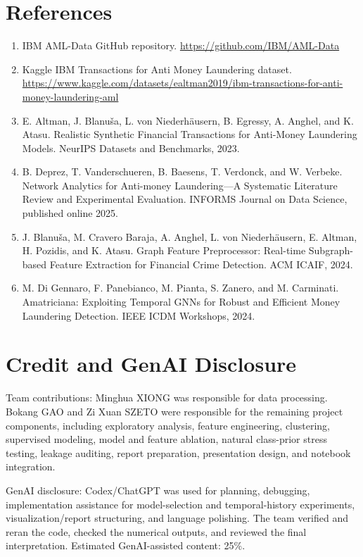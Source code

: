 \documentclass{article}
\begin{document}
\section{References}
\begin{enumerate}
\item IBM AML-Data GitHub repository. \url{https://github.com/IBM/AML-Data}
\item Kaggle IBM Transactions for Anti Money Laundering dataset. \url{https://www.kaggle.com/datasets/ealtman2019/ibm-transactions-for-anti-money-laundering-aml}
\item E. Altman, J. Blanu\v{s}a, L. von Niederh\"ausern, B. Egressy, A. Anghel, and K. Atasu. Realistic Synthetic Financial Transactions for Anti-Money Laundering Models. NeurIPS Datasets and Benchmarks, 2023.
\item B. Deprez, T. Vanderschueren, B. Baesens, T. Verdonck, and W. Verbeke. Network Analytics for Anti-money Laundering---A Systematic Literature Review and Experimental Evaluation. INFORMS Journal on Data Science, published online 2025.
\item J. Blanu\v{s}a, M. Cravero Baraja, A. Anghel, L. von Niederh\"ausern, E. Altman, H. Pozidis, and K. Atasu. Graph Feature Preprocessor: Real-time Subgraph-based Feature Extraction for Financial Crime Detection. ACM ICAIF, 2024.
\item M. Di Gennaro, F. Panebianco, M. Pianta, S. Zanero, and M. Carminati. Amatriciana: Exploiting Temporal GNNs for Robust and Efficient Money Laundering Detection. IEEE ICDM Workshops, 2024.
\end{enumerate}

\section{Credit and GenAI Disclosure}
Team contributions: Minghua XIONG was responsible for data processing. Bokang GAO and Zi Xuan SZETO were responsible for the remaining project components, including exploratory analysis, feature engineering, clustering, supervised modeling, model and feature ablation, natural class-prior stress testing, leakage auditing, report preparation, presentation design, and notebook integration.

GenAI disclosure: Codex/ChatGPT was used for planning, debugging, implementation assistance for model-selection and temporal-history experiments, visualization/report structuring, and language polishing. The team verified and reran the code, checked the numerical outputs, and reviewed the final interpretation. Estimated GenAI-assisted content: 25\%.
\end{document}

